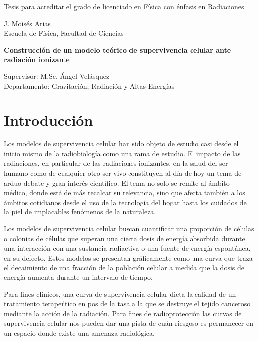 \documentclass[12pt,letterpaper, oneside]{book}
\begin{document}
\begin{titlepage}
\begin{center}
			\vspace{0.75cm}
			\Large Tesis para acreditar el grado de licenciado en Física con énfasis en Radiaciones\\
			
			\vspace{1.25cm}		
			
			\large{J. Moisés Arias}\\
			\small{Escuela de Física, Facultad de Ciencias}
			
			\vfill
			
			\large{\textbf{Construcción de un modelo teórico de supervivencia celular ante radiación ionizante}}
			\vspace{0.75cm}
			
			\large Supervisor: M.Sc. Ángel Velásquez\\
			Departamento: Gravitación, Radiación y Altas Energías
		\end{center}
	\end{titlepage}
	
	\tableofcontents
	
	\chapter*{Introducción}
	
	Los modelos de supervivencia celular han sido objeto de estudio casi desde el inicio mismo de la radiobiología como una rama de estudio. El impacto de las radiaciones, en particular de las radiaciones ionizantes, en la salud del ser humano como de cualquier otro ser vivo constituyen al día de hoy un tema de arduo debate y gran interés científico. El tema no solo se remite al ámbito médico, donde está de más recalcar su relevancia, sino que afecta también a los ámbitos cotidianos desde el uso de la tecnología del hogar hasta los cuidados de la piel de implacables fenómenos de la naturaleza. 
	
	Los modelos de supervivencia celular buscan cuantificar una proporción de células o colonias de células que superan una cierta dosis de energía absorbida durante una interacción con una sustancia radiactiva o una fuente de energía espontánea, en su defecto. Estos modelos se presentan gráficamente como una curva que traza el decaimiento de una fracción de la población celular a medida que la dosis de energía aumenta durante un intervalo de tiempo. 
	
	Para fines clínicos, una curva de supervivencia celular dicta la calidad de un tratamiento terapeútico en pos de la tasa a la que se destruye el tejido canceroso mediante la acción de la radiación. Para fines de radioprotección las curvas de supervivencia celular nos pueden dar una pista de cuán riesgoso es permanecer en un espacio donde existe una amenaza radiológica. 
	
\end{document}
